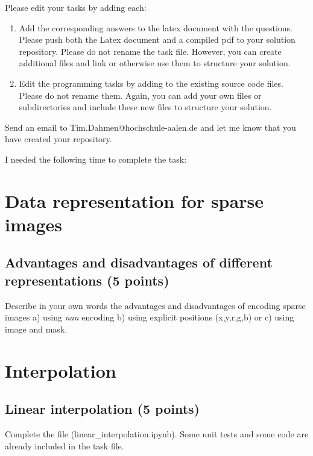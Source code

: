Please edit your tasks by adding each:

\begin{enumerate}
\item Add the corresponding answers to the latex document with the questions. Please push both the Latex document and a compiled pdf to your solution repository. Please do not rename the task file. However, you can create additional files and link or otherwise use them to structure your solution. 
\item Edit the programming tasks by adding to the existing source code files. Please do not rename them. Again, you can add your own files or subdirectories and include these new files to structure your solution. 
\end{enumerate}

Send an email to Tim.Dahmen@hochschule-aalen.de and let me know that you have created your repository. 

I needed the following time to complete the task:

\section{Data representation for sparse images}

\subsection{Advantages and disadvantages of different representations (5 points)}

Describe in your own words the advantages and disadvantages of encoding sparse images a) using \textit{nan} encoding b) using explicit positions (x,y,r,g,b) or c) using image and mask. 

\section{Interpolation}

\subsection{Linear interpolation (5 points)}

Complete the file (linear\_interpolation.ipynb). Some unit tests and some code are already included in the task file.

